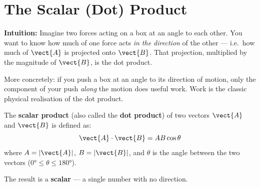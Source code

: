 \section{The Scalar (Dot) Product}
\label{sec:dot_product}

\textbf{Intuition:} Imagine two forces acting on a box
at an angle to each other. You want to know how much
of one force acts \textit{in the direction} of the
other --- i.e.\ how much of $\vect{A}$ is projected
onto $\vect{B}$. That projection, multiplied by the
magnitude of $\vect{B}$, is the dot product.

More concretely: if you push a box at an angle to its
direction of motion, only the component of your push
\textit{along} the motion does useful work. Work is
the classic physical realisation of the dot product.

\begin{definitionbox}
The \textbf{scalar product} (also called the
\textbf{dot product}) of two vectors $\vect{A}$ and
$\vect{B}$ is defined as:
\[
  \vect{A} \cdot \vect{B}
  = AB\cos\theta
\]
where $A = |\vect{A}|$, $B = |\vect{B}|$, and $\theta$
is the angle between the two vectors
($0° \leq \theta \leq 180°$).

The result is a \textbf{scalar} --- a single number
with no direction.
\end{definitionbox}

\begin{diagbox}
\begin{center}
\end{center}
\end{diagbox}


